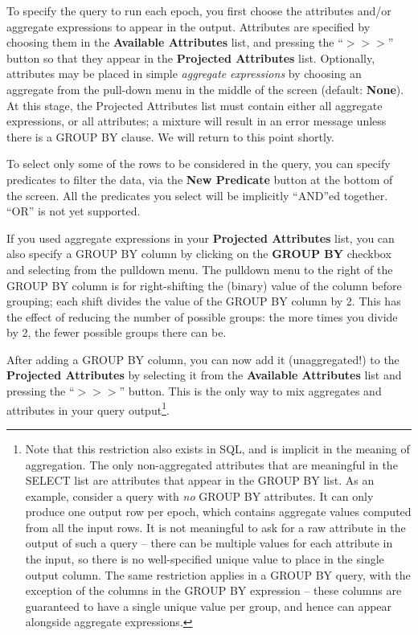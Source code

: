 \documentclass[11pt]{article}
\begin{document}
To specify the query to run each epoch, you first choose the
attributes and/or aggregate expressions to appear in the output.
Attributes are specified by choosing them in the {\bf Available
Attributes} list, and pressing the ``$>>>$'' button so that they
appear in the {\bf Projected Attributes} list.  Optionally, attributes
may be placed in simple {\em aggregate} {\em
expressions} by choosing an aggregate from the
pull-down menu in the middle of the screen (default: {\bf None}).  At
this stage, the Projected Attributes list must
contain either all aggregate expressions, or all attributes; a mixture
will result in an error message unless there is a GROUP BY
clause.  We will return to this point shortly.

To select only some of the rows to be considered in the query, you can
specify predicates to filter the data,
via the {\bf New Predicate} button at the bottom of the screen.  All
the predicates you select will be implicitly ``AND''ed together.  ``OR'' is
not yet supported.

If you used aggregate expressions in your {\bf Projected
Attributes} list, you can also specify a GROUP BY column by
clicking on the {\bf GROUP BY} checkbox and selecting from the
pulldown menu.  The pulldown menu to the right of the GROUP BY column
is for right-shifting the (binary) value of the column before
grouping; each shift divides the value of the GROUP BY column by 2.
This has the effect of reducing the number of possible groups: the
more times you divide by 2, the fewer possible groups there can be.

After adding a GROUP BY column, you can now add it (unaggregated!) to
the {\bf Projected Attributes} by selecting it from the {\bf Available
Attributes} list and pressing the ``$>>>$'' button.  This is the only
way to mix aggregates and attributes in your query
output\footnote{Note that this restriction also exists in SQL, and is
implicit in the meaning of aggregation.  The only non-aggregated
attributes that are meaningful in the SELECT list are attributes that
appear in the GROUP BY list.  As an example, consider a query
with {\em no} GROUP BY attributes.  It can only produce one output row
per epoch, which contains aggregate values computed from all the
input rows.  It is not meaningful to ask for a raw attribute in the
output of such a query -- there can be multiple values for each
attribute in the input, so there is no well-specified unique value to
place in the single output column.  The same restriction applies in a
GROUP BY query, with the exception of the columns in the GROUP BY
expression -- these columns are guaranteed to have a
single unique value per group, and hence can appear alongside aggregate
expressions.}.
\end{document}
